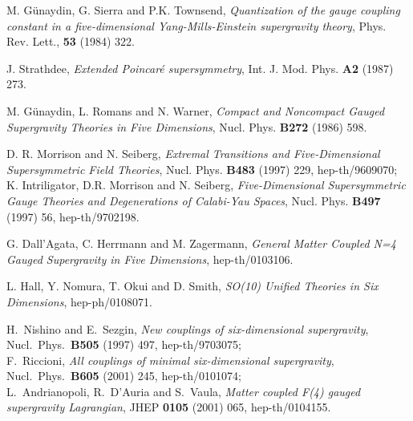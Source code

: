 \documentclass[a4paper,11pt]{article}
\begin{document}
\begin{thebibliography}{99}
 M. G\"{u}naydin, G. Sierra and  P.K. Townsend,
\emph{Quantization of the gauge coupling constant in a five-dimensional
Yang-Mills-Einstein supergravity theory}, Phys. Rev. Lett., \textbf{53}
(1984) 322.

 J. Strathdee, 
\emph{Extended Poincar\'{e} supersymmetry}, Int. J. Mod. Phys. \textbf{A2}
(1987) 273.

M. G\"{u}naydin, L. Romans and N. Warner,
\emph{Compact and Noncompact Gauged Supergravity Theories in Five
Dimensions}, Nucl. Phys. \textbf{B272} (1986) 598.

D. R. Morrison and N. Seiberg, \emph{Extremal Transitions
and Five-Dimensional Supersymmetric
Field Theories}, Nucl. Phys. \textbf{B483} (1997) 229, 
hep-th/9609070; \\
K. Intriligator, D.R. Morrison and N. Seiberg, 
\emph{Five-Dimensional Supersymmetric Gauge Theories and
Degenerations of Calabi-Yau Spaces}, Nucl. Phys. \textbf{B497} (1997)
56, hep-th/9702198.

  G. Dall'Agata, C. Herrmann and  M. Zagermann,
\emph{General Matter Coupled N=4 Gauged Supergravity in Five Dimensions},
hep-th/0103106. 

L. Hall, Y. Nomura, T. Okui and D. Smith,
\emph{SO(10) Unified Theories in Six Dimensions}, hep-ph/0108071.

H.~Nishino and E.~Sezgin,
\emph{New couplings of six-dimensional supergravity},
Nucl.\ Phys.\ {\bf B505} (1997) 497, hep-th/9703075;\\
F.~Riccioni,
\emph{All couplings of minimal six-dimensional supergravity},
Nucl.\ Phys.\ {\bf B605} (2001) 245, hep-th/0101074;\\
L.~Andrianopoli, R.~D'Auria and S.~Vaula,
\emph{Matter coupled F(4) gauged supergravity Lagrangian},
JHEP {\bf 0105} (2001) 065, hep-th/0104155.

\end{thebibliography}
\end{document}
